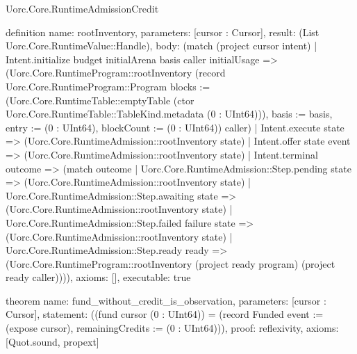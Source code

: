 \begin{lexlean}{Uorc.Core.RuntimeAdmissionCredit}
\begin{semanticmodule}
definition{
  name: rootInventory,
  parameters: [cursor : Cursor],
  result: (List Uorc.Core.RuntimeValue::Handle),
  body: (match (project cursor intent)
    | Intent.initialize budget initialArena basis caller initialUsage => (Uorc.Core.RuntimeProgram::rootInventory (record Uorc.Core.RuntimeProgram::Program {blocks := (Uorc.Core.RuntimeTable::emptyTable (ctor Uorc.Core.RuntimeTable::TableKind.metadata (0 : UInt64))), basis := basis, entry := (0 : UInt64), blockCount := (0 : UInt64)}) caller)
    | Intent.execute state => (Uorc.Core.RuntimeAdmission::rootInventory state)
    | Intent.offer state event => (Uorc.Core.RuntimeAdmission::rootInventory state)
    | Intent.terminal outcome => (match outcome
      | Uorc.Core.RuntimeAdmission::Step.pending state => (Uorc.Core.RuntimeAdmission::rootInventory state)
      | Uorc.Core.RuntimeAdmission::Step.awaiting state => (Uorc.Core.RuntimeAdmission::rootInventory state)
      | Uorc.Core.RuntimeAdmission::Step.failed failure state => (Uorc.Core.RuntimeAdmission::rootInventory state)
      | Uorc.Core.RuntimeAdmission::Step.ready ready => (Uorc.Core.RuntimeProgram::rootInventory (project ready program) (project ready caller)))),
  axioms: [],
  executable: true
}

theorem{
  name: fund_without_credit_is_observation,
  parameters: [cursor : Cursor],
  statement: ((fund cursor (0 : UInt64)) = (record Funded {event := (expose cursor), remainingCredits := (0 : UInt64)})),
  proof: reflexivity{},
  axioms: [Quot.sound, propext]
}
\end{semanticmodule}
\end{lexlean}
